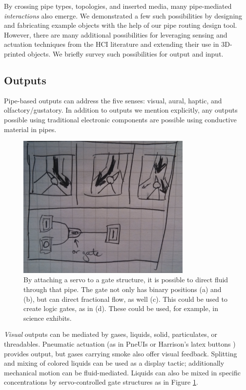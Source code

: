 By crossing pipe types, topologies, and inserted media, many pipe-mediated \emph{interactions} also emerge. We demonstrated a few such possibilities by designing and fabricating example objects with the help of our pipe routing design tool. However, there are many additional possibilities for leveraging sensing and actuation techniques from the HCI literature and extending their use in 3D-printed objects. We briefly survey such possibilities for output and input.

\subsection{Outputs}

Pipe-based outputs can address the five senses: visual, aural, haptic, and olfactory/gustatory.  In addition to outputs we mention explicitly, any outputs possible using traditional electronic components are possible using conductive material in pipes.

\begin{figure}[h]
\centering
    \includegraphics[width=3.4in]{figures/placeholder/direct.jpg}
\caption{By attaching a servo to a gate structure, it is possible to direct fluid through that pipe.  The gate not only has binary positions (a) and (b), but can direct fractional flow, as well (c).  This could be used to create logic gates, as in (d).  These could be used, for example, in science exhibits.}
\label{fig:direct}
\end{figure}

\emph{Visual} outputs can be mediated by gases, liquids, solid, particulates, or threadables.  Pneumatic actuation (as in PneUIs \cite{Yao-pneui} or Harrison's latex buttons \cite{Harrison-buttons}) provides output, but gases carrying smoke also offer visual feedback.  Splitting and mixing of colored liquids can be used as a display tactic; additionally mechanical motion can be fluid-mediated.  Liquids can also be mixed in specific concentrations by servo-controlled gate structures as in Figure \ref{fig:direct}.

